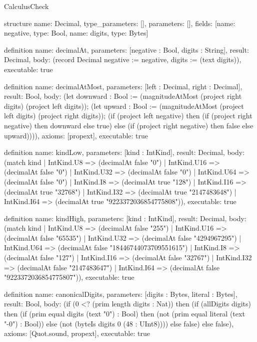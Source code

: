 \begin{lexlean}{CalculusCheck}
\begin{semanticmodule}
structure{
  name: Decimal,
  type_parameters: [],
  parameters: [],
  fields: [{name: negative, type: Bool}, {name: digits, type: Bytes}]
}

definition{
  name: decimalAt,
  parameters: [negative : Bool, digits : String],
  result: Decimal,
  body: (record Decimal {negative := negative, digits := (text digits)}),
  executable: true
}

definition{
  name: decimalAtMost,
  parameters: [left : Decimal, right : Decimal],
  result: Bool,
  body: (let downward : Bool := (magnitudeAtMost (project right digits) (project left digits)); (let upward : Bool := (magnitudeAtMost (project left digits) (project right digits)); (if (project left negative) then (if (project right negative) then downward else true) else (if (project right negative) then false else upward)))),
  axioms: [propext],
  executable: true
}

definition{
  name: kindLow,
  parameters: [kind : IntKind],
  result: Decimal,
  body: (match kind
    | IntKind.U8 => (decimalAt false "0")
    | IntKind.U16 => (decimalAt false "0")
    | IntKind.U32 => (decimalAt false "0")
    | IntKind.U64 => (decimalAt false "0")
    | IntKind.I8 => (decimalAt true "128")
    | IntKind.I16 => (decimalAt true "32768")
    | IntKind.I32 => (decimalAt true "2147483648")
    | IntKind.I64 => (decimalAt true "9223372036854775808")),
  executable: true
}

definition{
  name: kindHigh,
  parameters: [kind : IntKind],
  result: Decimal,
  body: (match kind
    | IntKind.U8 => (decimalAt false "255")
    | IntKind.U16 => (decimalAt false "65535")
    | IntKind.U32 => (decimalAt false "4294967295")
    | IntKind.U64 => (decimalAt false "18446744073709551615")
    | IntKind.I8 => (decimalAt false "127")
    | IntKind.I16 => (decimalAt false "32767")
    | IntKind.I32 => (decimalAt false "2147483647")
    | IntKind.I64 => (decimalAt false "9223372036854775807")),
  executable: true
}

definition{
  name: canonicalDigits,
  parameters: [digits : Bytes, literal : Bytes],
  result: Bool,
  body: (if (0 <? (prim length digits : Nat)) then (if (allDigits digits) then (if (prim equal digits (text "0") : Bool) then (not (prim equal literal (text "-0") : Bool)) else (not (byteIs digits 0 (48 : UInt8)))) else false) else false),
  axioms: [Quot.sound, propext],
  executable: true
}


\end{semanticmodule}
\end{lexlean}
